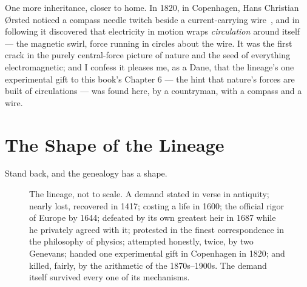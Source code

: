 \documentclass[fontsize=11pt,paper=a4,pagesize=auto,parskip=half-]{scrbook}
\newcommand{\Ixtmp}{}
\DeclareRobustCommand{\Ix}[1]{%
  #1%
  \begingroup
    \lowercase{\gdef\Ixtmp{#1}}%
    \expandafter\index\expandafter{\Ixtmp}%
  \endgroup}
\begin{document}
One more inheritance, closer to home. In 1820, in Copenhagen, Hans Christian Ørsted noticed a compass needle twitch beside a current-carrying wire~\cite{oersted1820}, and in following it discovered that electricity in motion wraps \emph{\Ix{circulation}} around itself --- the magnetic swirl, force running in circles about the wire. It was the first crack in the purely central-force picture of nature and the seed of everything electromagnetic; and I confess it pleases me, as a Dane, that the lineage's one experimental gift to this book's Chapter 6 --- the hint that nature's forces are built of circulations --- was found here, by a countryman, with a compass and a wire.

\section{The Shape of the Lineage}

Stand back, and the genealogy has a shape.


\begin{figure}[htbp]
\centering
{}
\caption{The lineage, not to scale. A demand stated in verse in antiquity; nearly lost, recovered in 1417; costing a life in 1600; the official rigor of Europe by 1644; defeated by its own greatest heir in 1687 while he privately agreed with it; protested in the finest correspondence in the philosophy of physics; attempted honestly, twice, by two Genevans; handed one experimental gift in Copenhagen in 1820; and killed, fairly, by the arithmetic of the 1870s--1900s. The demand itself survived every one of its mechanisms.}
\label{fig:lineage}
\end{figure}
\end{document}
